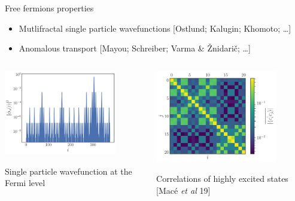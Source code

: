 \begin{frame}{Free fermions properties}
\begin{itemize}
	\item Mutlifractal single particle wavefunctions {\footnotesize[Ostlund; Kalugin; Khomoto; \dots]}
	\item Anomalous transport {\footnotesize[Mayou; Schreiber; Varma \& Žnidarič; \dots]}
\end{itemize}
\begin{columns}
\begin{column}{0.5\textwidth}
\centering
\includegraphics[width=0.8\textwidth]{img/3_Fibonacci/presence_prob}

{\footnotesize Single particle wavefunction at the Fermi level}
\end{column}
\begin{column}{0.5\textwidth}
\includegraphics[width=0.8\textwidth]{img/3_Fibonacci/density_matrix_L21_h3}

{\footnotesize Correlations of highly excited states [Macé \emph{et al} 19]}
\end{column}
\end{columns}
\end{frame}

